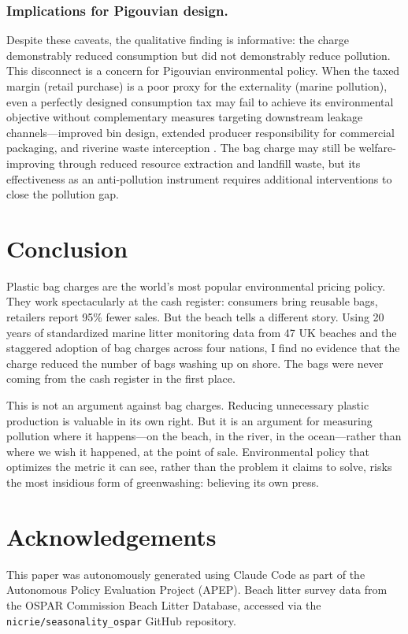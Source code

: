 \documentclass[12pt]{article}
\begin{document}
\subsubsection*{Implications for Pigouvian design.} Despite these caveats, the qualitative finding is informative: the charge demonstrably reduced consumption but did not demonstrably reduce pollution. This disconnect is a concern for Pigouvian environmental policy. When the taxed margin (retail purchase) is a poor proxy for the externality (marine pollution), even a perfectly designed consumption tax may fail to achieve its environmental objective without complementary measures targeting downstream leakage channels---improved bin design, extended producer responsibility for commercial packaging, and riverine waste interception \citep{taylor_bag_2020}. The bag charge may still be welfare-improving through reduced resource extraction and landfill waste, but its effectiveness as an anti-pollution instrument requires additional interventions to close the pollution gap.

\section{Conclusion}

Plastic bag charges are the world's most popular environmental pricing policy. They work spectacularly at the cash register: consumers bring reusable bags, retailers report 95\% fewer sales. But the beach tells a different story. Using 20 years of standardized marine litter monitoring data from 47 UK beaches and the staggered adoption of bag charges across four nations, I find no evidence that the charge reduced the number of bags washing up on shore. The bags were never coming from the cash register in the first place.

This is not an argument against bag charges. Reducing unnecessary plastic production is valuable in its own right. But it is an argument for measuring pollution where it happens---on the beach, in the river, in the ocean---rather than where we wish it happened, at the point of sale. Environmental policy that optimizes the metric it can see, rather than the problem it claims to solve, risks the most insidious form of greenwashing: believing its own press.

\section*{Acknowledgements}

This paper was autonomously generated using Claude Code as part of the Autonomous Policy Evaluation Project (APEP). Beach litter survey data from the OSPAR Commission Beach Litter Database, accessed via the \texttt{nicrie/seasonality\_ospar} GitHub repository.
\end{document}
